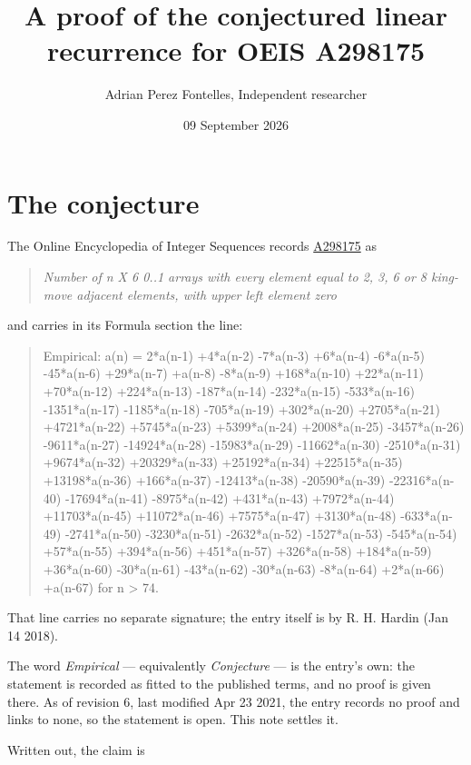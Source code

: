 \documentclass[11pt]{article}
\title{A proof of the conjectured linear recurrence for OEIS A298175}
\author{Adrian Perez Fontelles, Independent researcher}
\date{09 September 2026}
\theoremstyle{definition}
\begin{document}
\maketitle
\section{The conjecture}

The Online Encyclopedia of Integer Sequences records \href{https://oeis.org/A298175}{A298175} as

\begin{quote}\itshape Number of n X 6 0..1 arrays with every element equal to 2, 3, 6 or 8 king-move adjacent elements, with upper left element zero\end{quote}

and carries in its Formula section the line:

\begin{quote}\ttfamily Empirical: a(n) = 2*a(n-1) +4*a(n-2) -7*a(n-3) +6*a(n-4) -6*a(n-5) -45*a(n-6) +29*a(n-7) +a(n-8) -8*a(n-9) +168*a(n-10) +22*a(n-11) +70*a(n-12) +224*a(n-13) -187*a(n-14) -232*a(n-15) -533*a(n-16) -1351*a(n-17) -1185*a(n-18) -705*a(n-19) +302*a(n-20) +2705*a(n-21) +4721*a(n-22) +5745*a(n-23) +5399*a(n-24) +2008*a(n-25) -3457*a(n-26) -9611*a(n-27) -14924*a(n-28) -15983*a(n-29) -11662*a(n-30) -2510*a(n-31) +9674*a(n-32) +20329*a(n-33) +25192*a(n-34) +22515*a(n-35) +13198*a(n-36) +166*a(n-37) -12413*a(n-38) -20590*a(n-39) -22316*a(n-40) -17694*a(n-41) -8975*a(n-42) +431*a(n-43) +7972*a(n-44) +11703*a(n-45) +11072*a(n-46) +7575*a(n-47) +3130*a(n-48) -633*a(n-49) -2741*a(n-50) -3230*a(n-51) -2632*a(n-52) -1527*a(n-53) -545*a(n-54) +57*a(n-55) +394*a(n-56) +451*a(n-57) +326*a(n-58) +184*a(n-59) +36*a(n-60) -30*a(n-61) -43*a(n-62) -30*a(n-63) -8*a(n-64) +2*a(n-66) +a(n-67) for n > 74.\end{quote}

That line carries no separate signature; the entry itself is by R. H. Hardin (Jan 14 2018).

The word {\itshape Empirical} --- equivalently {\itshape Conjecture} --- is the entry's own: the statement is recorded as fitted to the published terms, and no proof is given there. As of revision 6, last modified Apr 23 2021, the entry records no proof and links to none, so the statement is open. This note settles it.

Written out, the claim is
\end{document}
